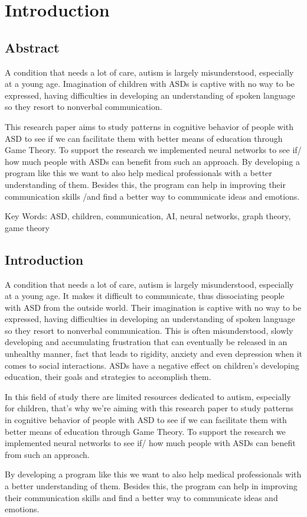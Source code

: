 \chapter{Introduction}

\section{Abstract}

A condition that needs a lot of care, autism is largely misunderstood, especially at a young age. 
Imagination of children with ASDs is captive with no way to be expressed, having difficulties in developing
an understanding of spoken language so they resort to nonverbal communication. 

This research paper aims to study patterns in cognitive behavior of people with ASD to see if we can facilitate 
them with better means of education through Game Theory. To support the research we implemented neural networks 
to see if/ how much people with ASDs can benefit from such an approach. By developing a program like this we want 
to also help medical professionals with a better understanding of them. Besides this, the program can help in 
improving their communication skills /and find a better way to communicate ideas and emotions.

{Key Words:}
ASD, children, communication, AI, neural networks, graph theory, game theory 

\section{Introduction}

A condition that needs a lot of care, autism is largely misunderstood, especially at a young age. 
It makes it difficult to communicate, thus dissociating people with ASD from the outside world.
Their imagination is captive with no way to be expressed, having difficulties in developing
an understanding of spoken language so they resort to nonverbal communication. This is often
misunderstood, slowly developing and accumulating frustration that can eventually be released
in an unhealthy manner, fact that leads to rigidity, anxiety and even depression when it comes to
social interactions. ASDs have a negative effect on children's developing education, their goals
and strategies to accomplish them.

In this field of study there are limited resources dedicated to autism, especially for children,
that's why we're aiming with this research paper to study patterns in cognitive behavior of people
with ASD to see if we can facilitate them with better means of education through Game Theory.
To support the research we implemented neural networks to see if/ how much people with ASDs can benefit
from such an approach.

By developing a program like this we want to also help medical professionals with a better understanding
of them. Besides this, the program can help in improving their communication skills and find a better
way to communicate ideas and emotions.